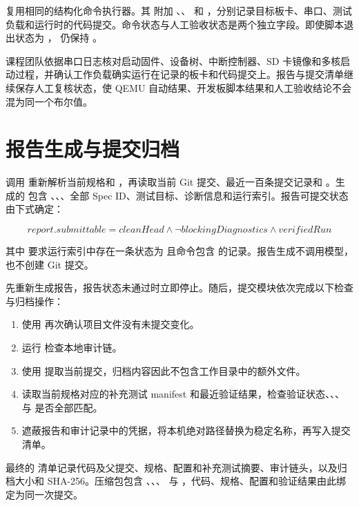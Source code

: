  复用相同的结构化命令执行器。其  附加 、、 和 ，分别记录目标板卡、串口、测试负载和运行时的代码提交。命令状态与人工验收状态是两个独立字段。即使脚本退出状态为 ， 仍保持 。

课程团队依据串口日志核对启动固件、设备树、中断控制器、SD 卡镜像和多核启动过程，并确认工作负载确实运行在记录的板卡和代码提交上。报告与提交清单继续保存人工复核状态，使 QEMU 自动结果、开发板脚本结果和人工验收结论不会混为同一个布尔值。

\section{报告生成与提交归档}

 调用  重新解析当前规格和 ，再读取当前 Git 提交、最近一百条提交记录和 。生成的  包含 、、、全部 Spec ID、测试目标、诊断信息和运行索引。报告可提交状态由下式确定：

\begin{equation}
  report.submittable = cleanHead \land \neg blockingDiagnostics \land verifiedRun
\end{equation}

其中  要求运行索引中存在一条状态为  且命令包含  的记录。报告生成不调用模型，也不创建 Git 提交。

 先重新生成报告，报告状态未通过时立即停止。随后，提交模块依次完成以下检查与归档操作：

\begin{enumerate}[itemsep=0.2em,topsep=0.4em]
  \item 使用  再次确认项目文件没有未提交变化。
  \item 运行  检查本地审计链。
  \item 使用  提取当前提交，归档内容因此不包含工作目录中的额外文件。
  \item 读取当前规格对应的补充测试 manifest 和最近验证结果，检查验证状态、、、 与  是否全部匹配。
  \item 遮蔽报告和审计记录中的凭据，将本机绝对路径替换为稳定名称，再写入提交清单。
\end{enumerate}

最终的  清单记录代码及父提交、规格、配置和补充测试摘要、审计链头，以及归档大小和 SHA-256。压缩包包含 、、、 与 ，代码、规格、配置和验证结果由此绑定为同一次提交。

